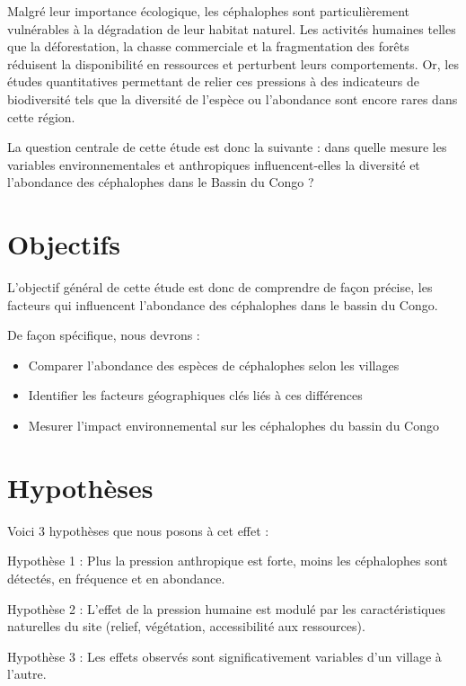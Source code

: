 \documentclass[
]{book}
\providecommand{\tightlist}{%
  \setlength{\itemsep}{0pt}\setlength{\parskip}{0pt}}
\begin{document}
Malgré leur importance écologique, les céphalophes sont particulièrement vulnérables à la dégradation de leur habitat naturel. Les activités humaines telles que la déforestation, la chasse commerciale et la fragmentation des forêts réduisent la disponibilité en ressources et perturbent leurs comportements. Or, les études quantitatives permettant de relier ces pressions à des indicateurs de biodiversité tels que la diversité de l'espèce ou l'abondance sont encore rares dans cette région.

La question centrale de cette étude est donc la suivante : dans quelle mesure les variables environnementales et anthropiques influencent-elles la diversité et l'abondance des céphalophes dans le Bassin du Congo ?

\section{Objectifs}\label{objectifs}

L'objectif général de cette étude est donc de comprendre de façon précise, les facteurs qui influencent l'abondance des céphalophes dans le bassin du Congo.

De façon spécifique, nous devrons :

\begin{itemize}
\tightlist
\item
  Comparer l'abondance des espèces de céphalophes selon les villages
\item
  Identifier les facteurs géographiques clés liés à ces différences
\item
  Mesurer l'impact environnemental sur les céphalophes du bassin du Congo
\end{itemize}

\section{Hypothèses}\label{hypothuxe8ses}

Voici 3 hypothèses que nous posons à cet effet :

Hypothèse 1 : Plus la pression anthropique est forte, moins les céphalophes sont détectés, en fréquence et en abondance.

Hypothèse 2 : L'effet de la pression humaine est modulé par les caractéristiques naturelles du site (relief, végétation, accessibilité aux ressources).

Hypothèse 3 : Les effets observés sont significativement variables d'un village à l'autre.
\end{document}
